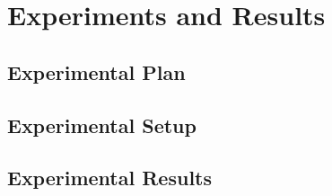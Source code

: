 \chapter{Experiments and Results}
\label{cha:ResearchAndResults}

\section{Experimental Plan}
\label{sec:experimentalPlan}

\section{Experimental Setup}
\label{sec:experimentalSetup}

\section{Experimental Results}
\label{sec:experimentalResults}
